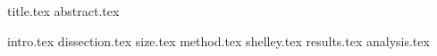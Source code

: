\documentclass[11pt]{llncs}
\begin{document}
{title.tex}
\thispagestyle{plain}
{abstract.tex}

{intro.tex}
{dissection.tex}
{size.tex} 
{method.tex}
{shelley.tex}
{results.tex}
{analysis.tex}

\end{document}
